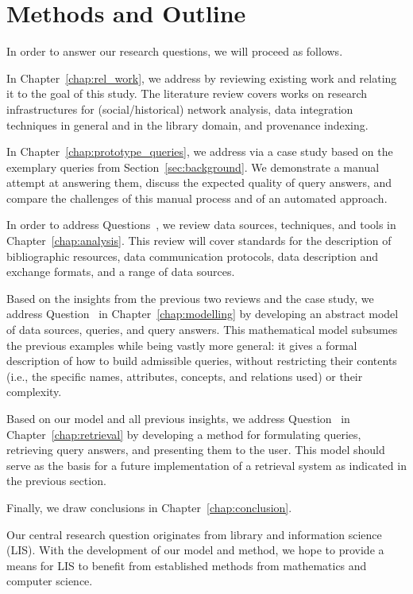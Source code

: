 \section{Methods and Outline}
\label{sec:methods}

In order to answer our research questions, we will proceed as follows.

In Chapter~\ref{chap:rel_work}, we address  by reviewing existing work 
and relating it to the goal of this study.
The literature review covers works on research infrastructures
for (social/historical) network analysis,
data integration techniques in general and in the library domain,
and provenance indexing.

In Chapter~\ref{chap:prototype_queries}, we address 
via a case study based on the exemplary queries from Section~\ref{sec:background}.
We demonstrate a manual attempt at answering them,
discuss the expected quality of query answers,
and compare the challenges of this manual process and of an automated approach.

In order to address Questions~, we review
data sources, techniques, and tools in Chapter~\ref{chap:analysis}.
This review will cover standards for the description of bibliographic resources,
data communication protocols, data description and exchange formats,
and a range of data sources.

Based on the insights from the previous two reviews and the case study,
we address Question~ in Chapter~\ref{chap:modelling} by
developing an abstract model of
data sources, queries, and query answers.
This mathematical model subsumes the previous examples
while being vastly more general: it gives a formal description of how to
build admissible queries, without restricting their contents
(i.e., the specific names, attributes, concepts, and relations used)
or their complexity. 

Based on our model and all previous insights,
we address Question~ in Chapter~\ref{chap:retrieval} by
developing a method for formulating queries, retrieving query answers,
and presenting them to the user.
This model should serve as the basis for a future implementation of a retrieval system
as indicated in the previous section.

Finally, we draw conclusions in Chapter~\ref{chap:conclusion}.

Our central research question originates from library and information science (LIS).
With the development of our model and method,
we hope to provide a means for LIS to benefit 
from established methods from mathematics and computer science.

